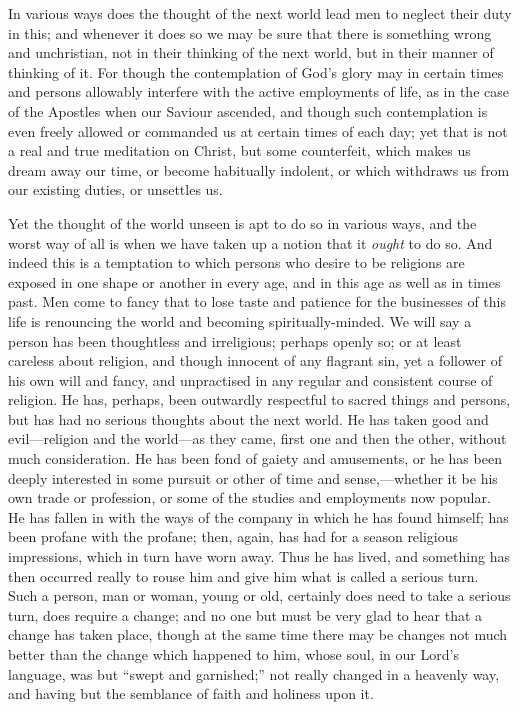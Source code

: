 In various ways does the thought of the next world lead men to
neglect their duty in this; and whenever it does so we may be sure
that there is something wrong and unchristian, not in their thinking
of the next world, but in their manner of thinking of it. For though
the contemplation of God's glory may in certain times and persons
allowably interfere with the active employments of life, as in the
case of the Apostles when our Saviour ascended, and though such
contemplation is even freely allowed or commanded us at certain times
of each day; yet that is not a real and true meditation on Christ, but
some counterfeit, which makes us dream away our time, or become
habitually indolent, or which withdraws us from our existing duties,
or unsettles us.

Yet the thought of the world unseen is apt to do so in various
ways, and the worst way of all is when we have taken up a notion that
it \emph{ought} to do so. And indeed this is a temptation to which
persons who desire to be religions are exposed in one shape or another
in every age, and in this age as well as in times past. Men come to
fancy that to lose taste and patience for the businesses of this life
is renouncing the world and becoming spiritually-minded. We will say a
person has been thoughtless and irreligious; perhaps openly so; or at
least careless about religion, and though innocent of any flagrant
sin, yet a follower of his own will and fancy, and unpractised in any
regular and consistent course of religion. He has, perhaps, been
outwardly respectful to sacred things and persons, but has had no
serious thoughts about the next world. He has taken good and evil—religion
and the world—as they came, first one and then the other, without
much consideration. He has been fond of gaiety and amusements, or he
has been deeply interested in some pursuit or other of time and sense,—whether
it be his own trade or profession, or some of the studies and
employments now popular. He has fallen in with the ways of the company
in which he has found himself; has been profane with the profane;
then, again, has had for a season religious impressions, which in turn
have worn away. Thus he has lived, and something has then occurred
really to rouse him and give him what is called a serious turn. Such a
person, man or woman, young or old, certainly does need to take a
serious turn, does require a change; and no one but must be very glad
to hear that a change has taken place, though at the same time there
may be changes not much better than the change which happened to him,
whose soul, in our Lord's language, was but ``swept and
garnished;'' not really changed in a heavenly way, and having but
the semblance of faith and holiness upon it.

